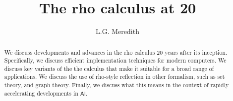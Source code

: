 \def\lastname{Meredith}

\title{The rho calculus at 20}

\author{ L.G. Meredith }

\maketitle              %


\begin{abstract}

  We discuss developments and advances in the rho calculus 20 years
  after its inception. Specifically, we discuss efficient
  implementation techniques for modern computers. We discuss key
  variants of the the calculus that make it suitable for a broad range
  of applications. We discuss the use of rho-style reflection in other
  formalism, such as set theory, and graph theory. Finally, we discuss
  what this means in the context of rapidly accelerating developments
  in $\mathsf{AI}$.

\end{abstract}



